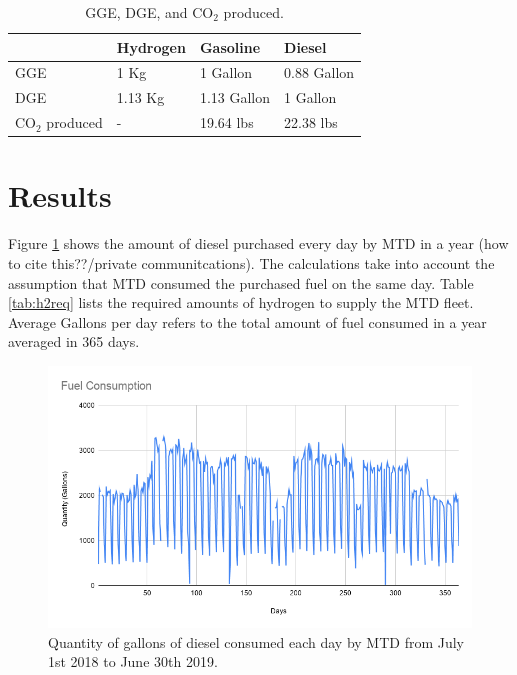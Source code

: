 \documentclass{anstrans}
\begin{document}
\begin{table}[!h]
	\centering
    \caption{GGE, DGE, and CO$_2$ produced.}
    \label{tab:meth}
	\begin{tabular}{l|lll}
	\hline
	                 & Hydrogen & Gasoline    & Diesel      \\ \hline
	GGE              & 1 Kg     & 1 Gallon    & 0.88 Gallon \\
	DGE              & 1.13 Kg  & 1.13 Gallon & 1 Gallon    \\
    CO$_2$ produced  & -        & 19.64 lbs   & 22.38 lbs   \\ \hline

	\end{tabular}
\end{table}

\section{Results}

Figure \ref{fig:mtdfuel} shows the amount of diesel purchased every day by MTD in a year (how to cite this??/private communitcations). The calculations take into account the assumption that MTD consumed the purchased fuel on the same day.
Table \ref{tab:h2req} lists the required amounts of hydrogen to supply the MTD fleet. Average Gallons per day refers to the total amount of fuel consumed in a year averaged in 365 days.

\begin{figure}[!h]
	\centering
	\includegraphics[width=1.05\linewidth]{figures/fuelconsumption.png}
	\hfill
	\caption{Quantity of gallons of diesel consumed each day by MTD from July 1st 2018 to June 30th 2019.}
	\label{fig:mtdfuel}
\end{figure}
\end{document}
